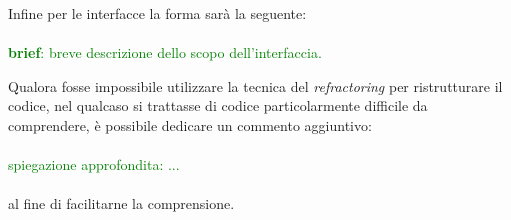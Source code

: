 Infine per le interfacce la forma sarà la seguente:
\\
\\
\textcolor{green}{
\textbf{brief}: breve descrizione dello scopo dell'interfaccia.\\}

Qualora fosse impossibile utilizzare la tecnica del \textit{refractoring} per ristrutturare il codice, nel qualcaso si trattasse di codice particolarmente difficile da comprendere, è possibile dedicare un commento aggiuntivo:
\\
\\
\textcolor{green}{spiegazione approfondita: ...\\}\\
al fine di facilitarne la comprensione.

